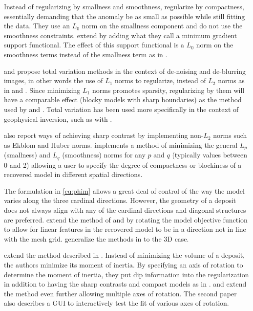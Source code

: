 Instead of regularizing by smallness and smoothness, \cite{last1983compact} regularize by compactness, essentially demanding that the anomaly be as small as possible while still fitting the data. They use an $L_0$ norm on the smallness component and do not use the smoothness constraints. \cite{portniaguine1999focusing} extend  \cite{last1983compact} by adding what they call a minimum gradient support functional. The effect of this support functional is a $L_0$ norm on the smoothness terms instead of the smallness term as in \cite{last1983compact}.

\cite{rudin1992nonlinear} and \cite{vogel1998fast} propose total variation methods in the context of de-noising and de-blurring images, in other words the use of $L_1$ norms to regularize, instead of $L_2$ norms as in \cite{li19963} and \cite{li19983}. Since minimizing $L_1$ norms promotes sparsity, regularizing by them will have a comparable effect (blocky models with sharp boundaries) as the method used by \cite{last1983compact} and \cite{portniaguine1999focusing}. Total variation has been used more specifically in the context of geophysical inversion, such as with \cite{guitton2012blocky}.	

\cite{farquharson1998non} also report ways of achieving sharp contrast by implementing non-$L_2$ norms such as Ekblom and Huber norms. \cite{fournier2015cooperative} implements a method of minimizing the general $L_p$ (smallness) and $L_q$ (smoothness) norms for any $p$ and $q$ (typically values between 0 and 2) allowing a user to specify the degree of compactness or blockiness of a recovered model in different spatial directions.

The formulation in \autoref{eq:phim} allows a great deal of control of the way the model varies along the three cardinal directions. However, the geometry of a deposit does not always align with any of the cardinal directions and diagonal structures are preferred. \cite{li2000incorporating}  extend the method of \cite{li19963} and \cite{li19983} by rotating the model objective function to allow for linear features in the recovered model to be in a direction not in line with the mesh grid. \cite{lelievre2009comprehensive} generalize the methods in \cite{li2000incorporating} to the 3D case.

\cite{guillen1984gravity} extend the method described in \cite{last1983compact}. Instead of minimizing the volume of a deposit, the authors minimize its moment of inertia. By specifying an axis of rotation to determine the moment of inertia, they put dip information into the regularization in addition to having the sharp contrasts and compact models as in \cite{last1983compact}.  \cite{barbosa1994generalized} and \cite{barbosa2006interactive} extend the method even further allowing multiple axes of rotation. The second paper also describes a GUI to interactively test the fit of various axes of rotation.

